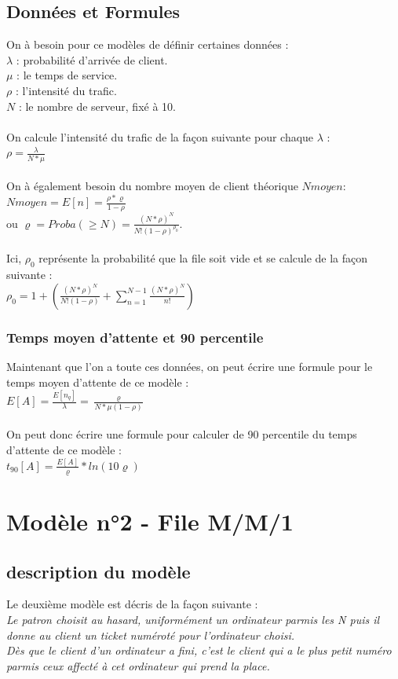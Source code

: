 \documentclass[a4paper,11pt]{article}
\begin{document}
	\subsection{Données et Formules}
	On à besoin pour ce modèles de définir certaines données :\\
	$\lambda$ : probabilité d'arrivée de client.\\
	$\mu$ : le temps de service.\\
	$\rho$ : l'intensité du trafic.\\
	$N$ : le nombre de serveur, fixé à 10.\\
	\\
	On calcule l'intensité du trafic de la façon suivante pour chaque 	$\lambda$ : \\
	$\rho = \frac{\lambda}{N*\mu}$\\
	\\
	On à également besoin du nombre moyen de client théorique $Nmoyen$:\\
	$Nmoyen = E[n] = \frac{\rho * \varrho}{1-\rho}$\\
	ou $\varrho = Proba(\ge N) = \frac{(N*\rho)^{N}}{N!(1-\rho)^{\rho_{0}}}$.\\
	\\
	Ici, $\rho_{0}$ représente la probabilité que la file soit vide et se calcule de la façon suivante :\\
	$\rho_{0} = 1 + (\frac{(N*\rho)^{N}}{N!(1-\rho)}+\sum^{N-1}_{n = 1}\frac{(N*\rho)^{N}}{n!})$\\
		\subsubsection{Temps moyen d'attente et 90 percentile}
		Maintenant que l'on a toute ces données, on peut écrire une formule pour le temps moyen d'attente de ce modèle :\\
		$E[A] = \frac{E[n_{q}]}{\lambda} = \frac{\varrho}{N*\mu(1-\rho)}$\\
		\\
		On peut donc écrire une formule pour calculer de 90 percentile du temps d'attente de ce modèle :\\
		$t_{90}[A] = \frac{E[A]}{\varrho}*ln(10\varrho)$\\
	

\section{Modèle n°2 - File M/M/1}
	\subsection{description du modèle}
	Le deuxième modèle est décris de la façon suivante :\\
	\textit{Le patron choisit au hasard, uniformément un ordinateur parmis les N puis il donne au client un ticket numéroté pour l'ordinateur choisi.\\
			Dès que le client d'un ordinateur a fini, c'est le client qui a le plus petit numéro parmis ceux affecté à cet ordinateur qui prend la place.}
\end{document}
